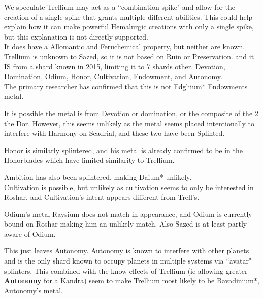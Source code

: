 \documentclass[conference]{IEEEtran}
\begin{document}
We speculate Trellium may act as a ``combination spike" and allow for the creation of a single spike that grants multiple different abilities.  This could help explain how it can make powerful Hemalurgic creations with only a single spike, but this explanation is not directly supported.\\
 
It does have a Allomantic and Feruchemical property, but neither are known.\\

Trellium is unknown to Sazed,\cite{SoS-EP} so it is not based on Ruin or Preservation. and it IS from a shard known in 2015,\cite{trell-known} limiting it to 7 shards other.  Devotion, Domination, Odium, Honor, Cultivation, Endowment, and Autonomy.\\

The primary researcher has confirmed that this is not Edgliium* Endowments metal.\cite{not-endow} 

It is possible the metal is from Devotion or domination, or the composite of the 2 the Dor.\cite{dorium}  However, this seems unlikely as the metal seems placed intentionally to interfere with Harmony on Scadrial, and these two have been Splinted.\cite{arcanum-sel}\cite{WoK-ep22}

Honor is similarly splintered,\cite{OB-CH111}\cite{arcanum-roshar} and his metal is already confirmed to be in the Honorblades\cite{honorblade} which have limited similarity to Trellium.\cite{SoS-EP}

Ambition has also been splintered, making Daium* unlikely.\cite{arcanum-thren}\\

Cultivation is possible, but unlikely as cultivation seems to only be interested in Roshar, and Cultivation's intent appears different from Trell's.\cite{OB-CH111}\cite{arcanum-roshar}

Odium's metal Raysium\cite{RoW-CH84} does not match in appearance\cite{SoS-EP}, and Odium is currently bound on Roshar making him an unlikely match.\cite{arcanum-roshar}  Also Sazed is at least partly aware of Odium.

This just leaves Autonomy.  Autonomy is known to interfere with other planets and is the only shard known to occupy planets in multiple systems via ``avatar" splinters.\cite{arcanum-tel}  This combined with the know effects of Trellium (ie allowing greater \textbf{Autonomy} for a Kandra) seem to make Trellium most likely to be Bavadinium*, Autonomy's metal. 
\end{document}
